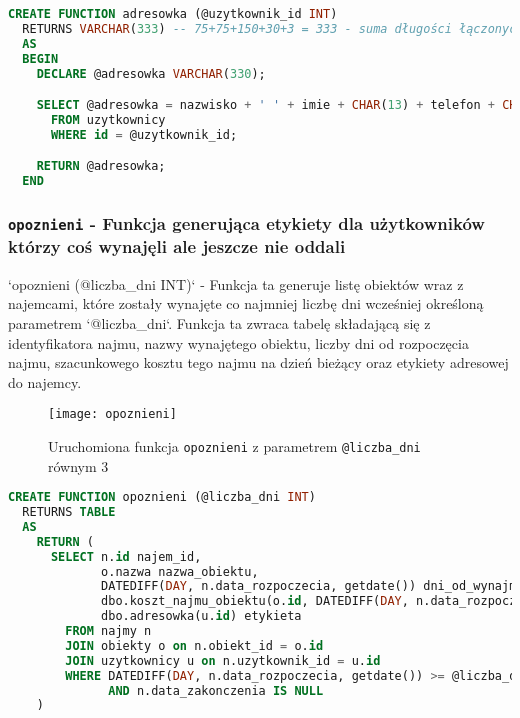 \begin{lstlisting}[language=SQL, caption={Skrypt tworzący funkcję skalarną \texttt{adresowka}}, label={lst:function-adresowka}]
CREATE FUNCTION adresowka (@uzytkownik_id INT)
  RETURNS VARCHAR(333) -- 75+75+150+30+3 = 333 - suma długości łączonych pól
  AS
  BEGIN
    DECLARE @adresowka VARCHAR(330);

    SELECT @adresowka = nazwisko + ' ' + imie + CHAR(13) + telefon + CHAR(13) + adres
      FROM uzytkownicy
      WHERE id = @uzytkownik_id;

    RETURN @adresowka;
  END
\end{lstlisting}

\subsubsection{\texttt{opoznieni} - Funkcja generująca etykiety dla użytkowników którzy coś wynajęli ale jeszcze nie oddali}

`opoznieni (@liczba_dni INT)` - Funkcja ta generuje listę obiektów wraz z najemcami, które zostały wynajęte co najmniej liczbę dni wcześniej określoną parametrem `@liczba_dni`. Funkcja ta zwraca tabelę składającą się z identyfikatora najmu, nazwy wynajętego obiektu, liczby dni od rozpoczęcia najmu, szacunkowego kosztu tego najmu na dzień bieżący oraz etykiety adresowej do najemcy.

\begin{figure}[h]
	\centering
    \texttt{[image: opoznieni]}
	\caption{Uruchomiona funkcja \texttt{opoznieni} z parametrem \texttt{@liczba\_dni} równym 3}
	\label{fig:opoznieni}
\end{figure}

\begin{lstlisting}[language=SQL, caption={Skrypt tworzący funkcję tabelarną \texttt{opoznieni}}, label={lst:function-opoznieni}]
CREATE FUNCTION opoznieni (@liczba_dni INT)
  RETURNS TABLE
  AS
    RETURN (
      SELECT n.id najem_id,
             o.nazwa nazwa_obiektu,
             DATEDIFF(DAY, n.data_rozpoczecia, getdate()) dni_od_wynajmu,
             dbo.koszt_najmu_obiektu(o.id, DATEDIFF(DAY, n.data_rozpoczecia, getdate()) + 1) szacunkowy_koszt_najmu,
             dbo.adresowka(u.id) etykieta
        FROM najmy n
        JOIN obiekty o on n.obiekt_id = o.id
        JOIN uzytkownicy u on n.uzytkownik_id = u.id
        WHERE DATEDIFF(DAY, n.data_rozpoczecia, getdate()) >= @liczba_dni
              AND n.data_zakonczenia IS NULL
    )
\end{lstlisting}